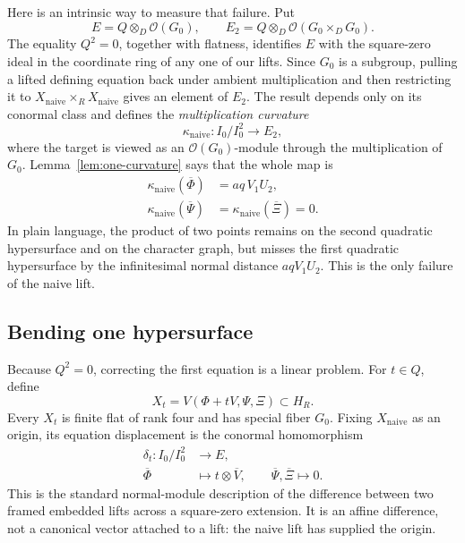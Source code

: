 \documentclass[11pt]{amsart}
\theoremstyle{definition}
\theoremstyle{remark}
\newcommand{\ot}{\otimes}
\begin{document}
Here is an intrinsic way to measure that failure.  Put
\[
 E=Q\ot_D\mathcal O(G_0),\qquad
 E_2=Q\ot_D\mathcal O(G_0\times_DG_0).
\]
The equality \(Q^2=0\), together with flatness, identifies \(E\) with
the square-zero ideal in the coordinate ring of any one of our lifts.
Since \(G_0\) is a subgroup, pulling a lifted defining equation back
under ambient multiplication and then restricting it to
\(X_{\mathrm{naive}}\times_RX_{\mathrm{naive}}\) gives an element of
\(E_2\).  The result depends only on its conormal class and defines the
\emph{multiplication curvature}
\[
 \kappa_{\mathrm{naive}}:
 I_0/I_0^2\longrightarrow E_2,
\]
where the target is viewed as an \(\mathcal O(G_0)\)-module through the
multiplication of \(G_0\).  Lemma~\ref{lem:one-curvature} says that the
whole map is
\begin{equation}\label{eq:naive-curvature}
 \begin{split}
  \kappa_{\mathrm{naive}}(\overline\Phi)
    &=aq\,V_1U_2,\\
  \kappa_{\mathrm{naive}}(\overline\Psi)
    &=\kappa_{\mathrm{naive}}(\overline\Xi)=0.
 \end{split}
\end{equation}
In plain language, the product of two points remains on the second
quadratic hypersurface and on the character graph, but misses the first
quadratic hypersurface by the infinitesimal normal distance
\(aqV_1U_2\).  This is the only failure of the naive lift.

\subsection{Bending one hypersurface}

Because \(Q^2=0\), correcting the first equation is a linear problem.
For \(t\in Q\), define
\begin{equation}\label{eq:embedded-lift-family}
 X_t=V(\Phi+tV,\Psi,\Xi)\subset H_R.
\end{equation}
Every \(X_t\) is finite flat of rank four and has special fiber \(G_0\).
Fixing \(X_{\mathrm{naive}}\) as an origin, its equation displacement is
the conormal homomorphism
\begin{equation}\label{eq:normal-equation-displacement}
 \begin{split}
  \delta_t:I_0/I_0^2&\longrightarrow E,\\
  \overline\Phi&\longmapsto t\otimes\overline V,\qquad
  \overline\Psi,\overline\Xi\longmapsto0.
 \end{split}
\end{equation}
This is the standard normal-module description of the difference
between two framed embedded lifts across a square-zero extension.  It is
an affine difference, not a canonical vector attached to a lift: the
naive lift has supplied the origin.
\end{document}
